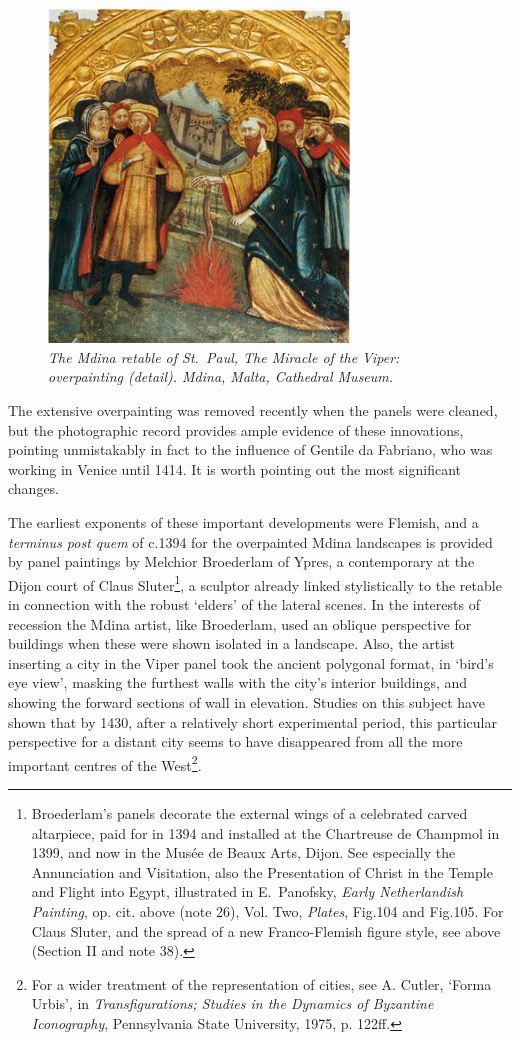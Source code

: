\documentclass[a4paper,12pt]{article}
\begin{document}
\begin{figure}[htbp]
\centering
\includegraphics[width=8cm]{pics/fig43.png}
\caption[The Mdina retable of St.~Paul, The Miracle of the Viper: overpainting
(detail)] 
{\it The Mdina retable of St.~Paul, The Miracle of the Viper: overpainting
(detail).  Mdina, Malta, Cathedral Museum.}
\end{figure}
The
extensive overpainting was removed recently when the panels were
cleaned, but the photographic record provides ample evidence of these
innovations, pointing unmistakably in fact to the influence of
Gentile da Fabriano, who was working in Venice until 1414. It is worth
pointing out the most significant changes.

The earliest exponents of these important developments were Flemish,
and a \textit{terminus post quem} of c.1394 for the overpainted Mdina
landscapes is provided by panel paintings by Melchior Broederlam of
Ypres, a contemporary at the Dijon court of Claus
Sluter\footnote{Broederlam's panels decorate the external wings of a
celebrated carved altarpiece, paid for in 1394 and installed at the
Chartreuse de Champmol in 1399, and now in the Mus\'ee de Beaux Arts,
Dijon. See especially the Annunciation and Visitation, also the
Presentation of Christ in the Temple and Flight into Egypt,
illustrated in E.~Panofsky, \textit{Early Netherlandish Painting},
op. cit. above (note 26), Vol. Two, \textit{Plates}, Fig.104 and
Fig.105. For Claus Sluter, and the spread of a new Franco-Flemish
figure style, see above (Section II and note 38).}, a sculptor already
linked stylistically to the retable in connection with the robust
`elders' of the lateral scenes. In the interests of recession the
Mdina artist, like Broederlam, used an oblique perspective for
buildings when these were shown isolated in a landscape. Also, the
artist inserting a city in the Viper panel took the ancient polygonal
format, in `bird's eye view', masking the furthest walls with the
city's interior buildings, and showing the forward sections of wall in
elevation. Studies on this subject have shown that by 1430, after a
relatively short experimental period, this particular perspective for
a distant city seems to have disappeared from all the more important
centres of the West\footnote{For a wider treatment of the
representation of cities, see A. Cutler, `Forma Urbis', in
\textit{Transfigurations; Studies in the Dynamics of Byzantine
Iconography}, Pennsylvania State University, 1975, p. 122ff.}.
\end{document}

